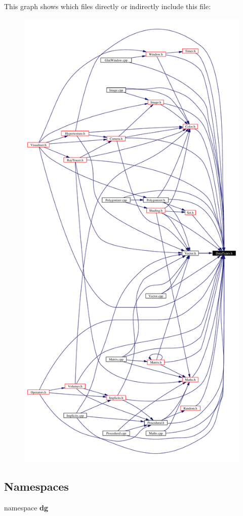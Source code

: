 This graph shows which files directly or indirectly include this file:\begin{figure}[H]
\begin{center}
\leavevmode
\includegraphics[width=344pt]{DataTypes_8h__dep__incl}
\end{center}
\end{figure}
\subsection*{Namespaces}
\begin{CompactItemize}
\item 
namespace {\bf dg}
\end{CompactItemize}
